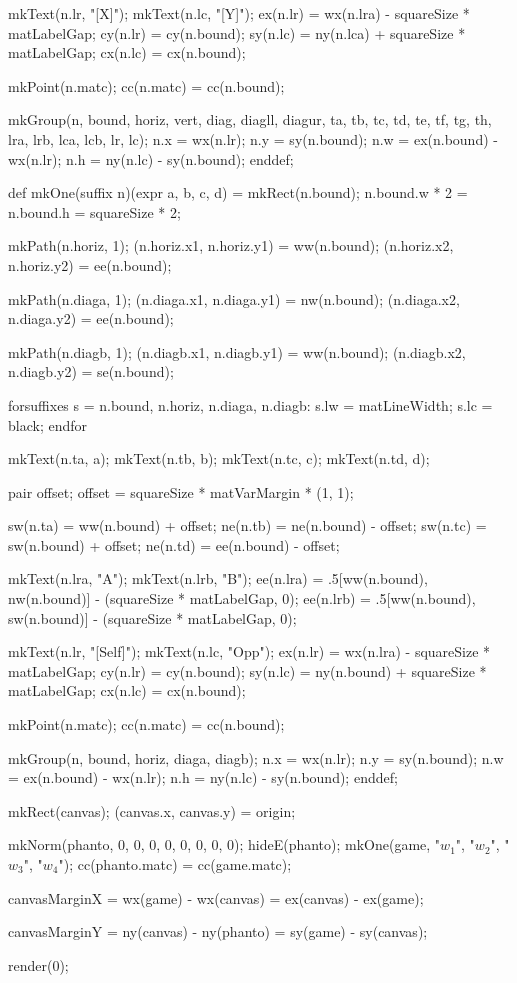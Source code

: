   mkText(n.lr, "[X]");
  mkText(n.lc, "[Y]");
  ex(n.lr) = wx(n.lra) - squareSize * matLabelGap;
  cy(n.lr) = cy(n.bound);
  sy(n.lc) = ny(n.lca) + squareSize * matLabelGap;
  cx(n.lc) = cx(n.bound);

  mkPoint(n.matc);
  cc(n.matc) = cc(n.bound);

  mkGroup(n, bound, horiz, vert, diag, diagll, diagur, ta, tb, tc, td, te, tf, tg, th, lra, lrb, lca, lcb, lr, lc);
  n.x = wx(n.lr);
  n.y = sy(n.bound);
  n.w = ex(n.bound) - wx(n.lr);
  n.h = ny(n.lc) - sy(n.bound);
enddef;

def mkOne(suffix n)(expr a, b, c, d) =
  mkRect(n.bound);
  n.bound.w * 2 = n.bound.h = squareSize * 2;

  mkPath(n.horiz, 1);
  (n.horiz.x1, n.horiz.y1) = ww(n.bound);
  (n.horiz.x2, n.horiz.y2) = ee(n.bound);

  mkPath(n.diaga, 1);
  (n.diaga.x1, n.diaga.y1) = nw(n.bound);
  (n.diaga.x2, n.diaga.y2) = ee(n.bound);

  mkPath(n.diagb, 1);
  (n.diagb.x1, n.diagb.y1) = ww(n.bound);
  (n.diagb.x2, n.diagb.y2) = se(n.bound);

  forsuffixes s = n.bound, n.horiz, n.diaga, n.diagb:
    s.lw = matLineWidth;
    s.lc = black;
  endfor

  mkText(n.ta, a);
  mkText(n.tb, b);
  mkText(n.tc, c);
  mkText(n.td, d);

  pair offset;
  offset = squareSize * matVarMargin * (1, 1);

  sw(n.ta) = ww(n.bound) + offset;
  ne(n.tb) = ne(n.bound) - offset;
  sw(n.tc) = sw(n.bound) + offset;
  ne(n.td) = ee(n.bound) - offset;

  mkText(n.lra, "A");
  mkText(n.lrb, "B");
  ee(n.lra) = .5[ww(n.bound), nw(n.bound)] - (squareSize * matLabelGap, 0);
  ee(n.lrb) = .5[ww(n.bound), sw(n.bound)] - (squareSize * matLabelGap, 0);

  mkText(n.lr, "[Self]");
  mkText(n.lc, "Opp");
  ex(n.lr) = wx(n.lra) - squareSize * matLabelGap;
  cy(n.lr) = cy(n.bound);
  sy(n.lc) = ny(n.bound) + squareSize * matLabelGap;
  cx(n.lc) = cx(n.bound);

  mkPoint(n.matc);
  cc(n.matc) = cc(n.bound);

  mkGroup(n, bound, horiz, diaga, diagb);
  n.x = wx(n.lr);
  n.y = sy(n.bound);
  n.w = ex(n.bound) - wx(n.lr);
  n.h = ny(n.lc) - sy(n.bound);
enddef;


mkRect(canvas);
(canvas.x, canvas.y) = origin;

mkNorm(phanto, 0, 0, 0, 0, 0, 0, 0, 0);
hideE(phanto);
mkOne(game, "$w_1$", "$w_2$", "$w_3$", "$w_4$");
cc(phanto.matc) = cc(game.matc);

canvasMarginX =
wx(game) - wx(canvas) =
ex(canvas) - ex(game);

canvasMarginY =
ny(canvas) - ny(phanto) =
sy(game) - sy(canvas);

\stopMPinitializations

\startMPpage
  render(0);
\stopMPpage
